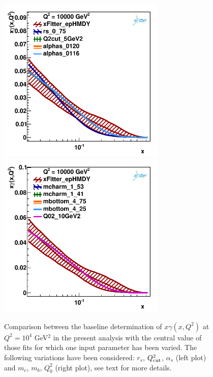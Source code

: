 \begin{figure}[t]
\centering
\includegraphics[width=8cm]{figs/q2_10000_pdf_ph_model_1}
\includegraphics[width=8cm]{figs/q2_10000_pdf_ph_model_2}
\caption{Comparison between the baseline determination of
  $x\gamma(x,Q^2)$ at $Q^2=10^4$ GeV$^2$ in the present
  analysis with the central value of those  fits for which one input parameter has been varied.
 The following variations have been considered: $r_s$, $Q^2_{\rm cut}$, $\alpha_s$ (left plot) and
$m_c$, $m_b$, $Q_0^2$ (right plot), see text for more details.
}
\label{fig:model}
\end{figure}

